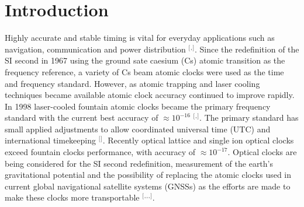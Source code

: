 \section{\label{sec:level1}Introduction}
Highly accurate and stable timing is vital for everyday applications such as navigation, communication and power distribution $^[$\citep{Knappe2007MEMSClocks}$^,$\citep{Mileti2017IntroductionClocks}$^]$. Since the redefinition of the SI second in 1967 using the ground sate caesium (Cs) atomic transition as the frequency reference, a variety of Cs beam atomic clocks were used as the time and frequency standard. However, as atomic trapping and laser cooling techniques became available atomic clock accuracy continued to improve rapidly. In 1998 laser-cooled fountain atomic clocks became the primary frequency standard with the current best accuracy of $\approx10^{-16}$   $^[$\citep{LombardiM.A.andHeavnerT.PandJefferts2007NISTSI}$^,$\citep{Guena2012ProgressLNE-SYRTE}$^]$. The primary standard has small applied adjustments to allow coordinated universal time (UTC) and international timekeeping $^[$\citep{Lombardi2002NISTServices}$^]$. Recently optical lattice and single ion optical clocks exceed fountain clocks performance, with accuracy of $\approx10^{-17}$. Optical clocks are being considered for the SI second redefinition, measurement of the earth's gravitational potential and the possibility of replacing the atomic clocks used in current global navigational satellite systems (GNSSs) as the efforts are made to make these clocks more transportable $^[$\citep{Gill2011WhenSecond}$^,$\citep{Margolis2014TimekeepersFuture}$^,$\citep{Margolis2010OpticalClocks}$^,$\citep{Godun2017TransportableTimes}$^]$.


